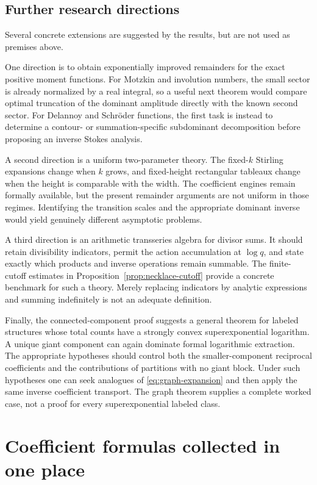 \documentclass[11pt,a4paper]{article}
\numberwithin{equation}{section}
\theoremstyle{definition}
\theoremstyle{remark}
\begin{document}
\subsection{Further research directions}

Several concrete extensions are suggested by the results, but are not used as premises above.

One direction is to obtain exponentially improved remainders for the exact positive moment functions. For Motzkin and involution numbers, the small sector is already normalized by a real integral, so a useful next theorem would compare optimal truncation of the dominant amplitude directly with the known second sector. For Delannoy and Schr\"oder functions, the first task is instead to determine a contour- or summation-specific subdominant decomposition before proposing an inverse Stokes analysis.

A second direction is a uniform two-parameter theory. The fixed-$k$ Stirling expansions change when $k$ grows, and fixed-height rectangular tableaux change when the height is comparable with the width. The coefficient engines remain formally available, but the present remainder arguments are not uniform in those regimes. Identifying the transition scales and the appropriate dominant inverse would yield genuinely different asymptotic problems.

A third direction is an arithmetic transseries algebra for divisor sums. It should retain divisibility indicators, permit the action accumulation at $\log q$, and state exactly which products and inverse operations remain summable. The finite-cutoff estimates in Proposition~\ref{prop:necklace-cutoff} provide a concrete benchmark for such a theory. Merely replacing indicators by analytic expressions and summing indefinitely is not an adequate definition.

Finally, the connected-component proof suggests a general theorem for labeled structures whose total counts have a strongly convex superexponential logarithm. A unique giant component can again dominate formal logarithmic extraction. The appropriate hypotheses should control both the smaller-component reciprocal coefficients and the contributions of partitions with no giant block. Under such hypotheses one can seek analogues of \eqref{eq:graph-expansion} and then apply the same inverse coefficient transport. The graph theorem supplies a complete worked case, not a proof for every superexponential labeled class.

\appendix
\section{Coefficient formulas collected in one place}
\label{app:coefficients}
\end{document}
